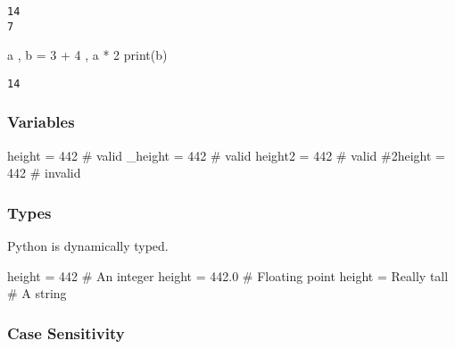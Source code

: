 \documentclass[
  letterpaper,
  DIV=11,
  numbers=noendperiod]{scrreprt}
\newenvironment{Shaded}{\begin{snugshade}}{\end{snugshade}}
\newcommand{\BuiltInTok}[1]{\textcolor[rgb]{0.00,0.46,0.62}{#1}}
\newcommand{\BuiltInTok}[1]{\textcolor[rgb]{0.00,0.48,0.65}{#1}}
\newcommand{\CommentTok}[1]{\textcolor[rgb]{0.37,0.37,0.37}{#1}}
\newcommand{\DecValTok}[1]{\textcolor[rgb]{0.68,0.00,0.00}{#1}}
\newcommand{\FloatTok}[1]{\textcolor[rgb]{0.68,0.00,0.00}{#1}}
\newcommand{\NormalTok}[1]{\textcolor[rgb]{0.00,0.46,0.62}{#1}}
\newcommand{\OperatorTok}[1]{\textcolor[rgb]{0.37,0.37,0.37}{#1}}
\newcommand{\FloatTok}[1]{\textcolor[rgb]{0.68,0.00,0.00}{#1}}
\newcommand{\NormalTok}[1]{\textcolor[rgb]{0.00,0.48,0.65}{#1}}
\newcommand{\OperatorTok}[1]{\textcolor[rgb]{0.37,0.37,0.37}{#1}}
\newcommand{\StringTok}[1]{\textcolor[rgb]{0.13,0.47,0.30}{#1}}
\begin{document}
\begin{verbatim}
14
7
\end{verbatim}

\begin{Shaded}
\begin{Highlighting}[]
\NormalTok{a , b }\OperatorTok{=} \DecValTok{3} \OperatorTok{+} \DecValTok{4}\NormalTok{ , a }\OperatorTok{*} \DecValTok{2}
\BuiltInTok{print}\NormalTok{(b)}
\end{Highlighting}
\end{Shaded}

\begin{verbatim}
14
\end{verbatim}

\hypertarget{variables}{%
\subsubsection{Variables}\label{variables}}

\begin{Shaded}
\begin{Highlighting}[]
\NormalTok{height }\OperatorTok{=} \DecValTok{442} \CommentTok{\# valid}
\NormalTok{\_height }\OperatorTok{=} \DecValTok{442} \CommentTok{\# valid}
\NormalTok{height2 }\OperatorTok{=} \DecValTok{442} \CommentTok{\# valid}
\CommentTok{\#2height = 442 \# invalid}
\end{Highlighting}
\end{Shaded}

\hypertarget{types}{%
\subsubsection{Types}\label{types}}

Python is dynamically typed.

\begin{Shaded}
\begin{Highlighting}[]
\NormalTok{height }\OperatorTok{=} \DecValTok{442}           \CommentTok{\# An integer}
\NormalTok{height }\OperatorTok{=} \FloatTok{442.0}         \CommentTok{\# Floating point}
\NormalTok{height }\OperatorTok{=} \StringTok{\textquotesingle{}Really tall\textquotesingle{}} \CommentTok{\# A string}
\end{Highlighting}
\end{Shaded}

\hypertarget{case-sensitivity}{%
\subsubsection{Case Sensitivity}\label{case-sensitivity}}
\end{document}
